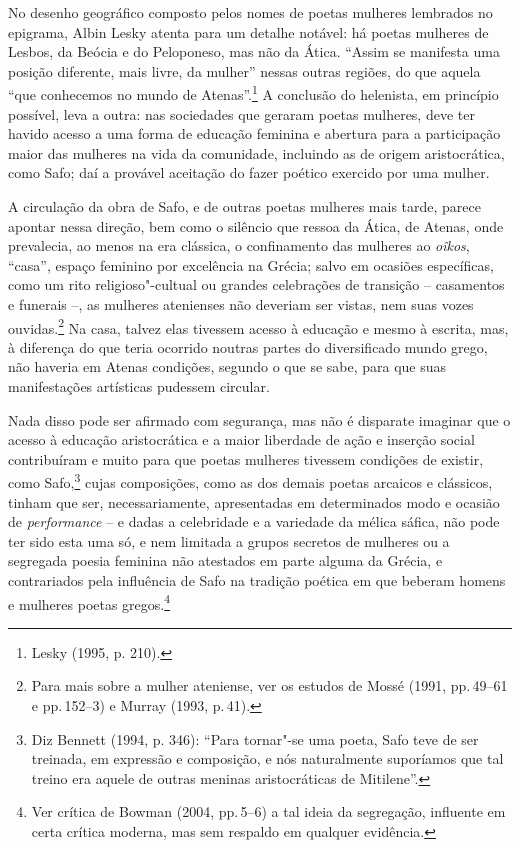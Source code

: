 No desenho geográfico composto pelos nomes de poetas mulheres
lembrados no epigrama, Albin Lesky atenta para um detalhe
notável: há poetas mulheres de Lesbos, da Beócia e do Peloponeso, mas não da
Ática. “Assim se manifesta uma posição diferente, mais livre, da mulher”
nessas outras regiões, do que aquela “que conhecemos no mundo de Atenas”.\footnote{ Lesky (1995, p. 210).} A
conclusão do helenista, em princípio possível, leva a outra: nas sociedades
que geraram poetas mulheres, deve ter havido acesso a uma forma de educação
feminina e abertura para a participação maior das mulheres na vida da
comunidade, incluindo as de origem aristocrática, como Safo; daí a provável
aceitação do fazer poético exercido por uma mulher.

A circulação da obra de Safo, e de outras poetas mulheres mais tarde, parece
apontar nessa direção, bem como o silêncio que ressoa da Ática, de Atenas, onde
prevalecia, ao menos na era clássica, o confinamento das mulheres ao \textit{oîkos}, “casa”, espaço
feminino por excelência na Grécia; salvo em ocasiões específicas, como um rito
religioso"-cultual ou grandes celebrações de transição -- casamentos e funerais --, as mulheres atenienses não deveriam ser vistas, nem suas
vozes ouvidas.\footnote{ Para mais sobre a mulher ateniense, ver os estudos de
Mossé (1991, pp.\,49--61 e pp.\,152--3) e Murray (1993, p.\,41).} Na casa, talvez elas
tivessem acesso à educação e mesmo à escrita, mas, à diferença do que teria
ocorrido noutras partes do diversificado mundo grego, não haveria em Atenas
condições, segundo o que se sabe, para que suas manifestações artísticas
pudessem circular.

Nada disso pode ser afirmado com segurança, mas não é disparate imaginar que o acesso
à educação aristocrática e a maior liberdade de ação e inserção social
contribuíram e muito para que poetas mulheres tivessem condições de existir,
como Safo,\footnote{ Diz Bennett (1994, p. 346):
“Para tornar"-se uma poeta, Safo teve de ser treinada, em expressão
e composição, e nós naturalmente suporíamos que tal treino era aquele de outras
meninas aristocráticas de Mitilene”.} cujas composições, como as dos demais
poetas arcaicos e clássicos, tinham que ser, necessariamente, apresentadas em
determinados modo e ocasião de \textit{performance} -- e dadas a celebridade e a variedade da mélica sáfica, não pode ter sido esta uma só, e nem limitada
a grupos secretos de mulheres ou a segregada poesia feminina não atestados em parte alguma da Grécia, e contrariados pela influência de Safo na tradição poética em que beberam homens e mulheres poetas gregos.\footnote{Ver crítica de Bowman (2004, pp.\,5--6) a tal ideia da segregação, influente em certa crítica moderna, mas sem respaldo em qualquer evidência.}


